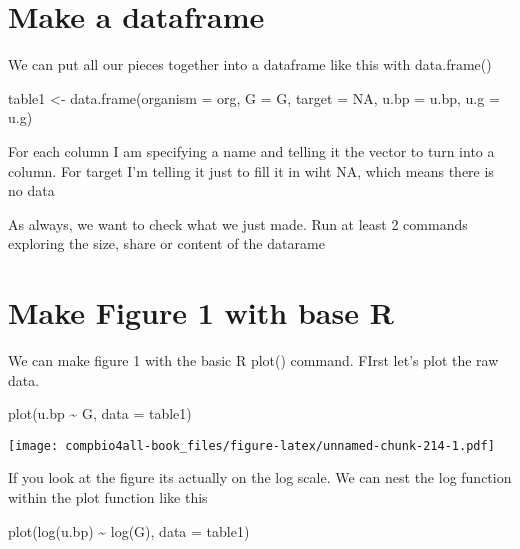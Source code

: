 \documentclass[
]{book}
\newenvironment{Shaded}{\begin{snugshade}}{\end{snugshade}}
\newcommand{\AttributeTok}[1]{\textcolor[rgb]{0.77,0.63,0.00}{#1}}
\newcommand{\ConstantTok}[1]{\textcolor[rgb]{0.00,0.00,0.00}{#1}}
\newcommand{\FunctionTok}[1]{\textcolor[rgb]{0.00,0.00,0.00}{#1}}
\newcommand{\NormalTok}[1]{#1}
\newcommand{\OtherTok}[1]{\textcolor[rgb]{0.56,0.35,0.01}{#1}}
\newcommand{\SpecialCharTok}[1]{\textcolor[rgb]{0.00,0.00,0.00}{#1}}
\begin{document}
\hypertarget{make-a-dataframe}{%
\section{Make a dataframe}\label{make-a-dataframe}}

We can put all our pieces together into a dataframe like this with data.frame()

\begin{Shaded}
\begin{Highlighting}[]
\NormalTok{table1 }\OtherTok{\textless{}{-}} \FunctionTok{data.frame}\NormalTok{(}\AttributeTok{organism =}\NormalTok{ org,}
           \AttributeTok{G =}\NormalTok{ G,}
           \AttributeTok{target =} \ConstantTok{NA}\NormalTok{,}
           \AttributeTok{u.bp =}\NormalTok{ u.bp,}
           \AttributeTok{u.g =}\NormalTok{ u.g)}
\end{Highlighting}
\end{Shaded}

For each column I am specifying a name and telling it the vector to turn into a column. For target I'm telling it just to fill it in wiht NA, which means there is no data

As always, we want to check what we just made. Run at least 2 commands exploring the size, share or content of the datarame

\hypertarget{make-figure-1-with-base-r}{%
\section{Make Figure 1 with base R}\label{make-figure-1-with-base-r}}

We can make figure 1 with the basic R plot() command. FIrst let's plot the raw data.

\begin{Shaded}
\begin{Highlighting}[]
\FunctionTok{plot}\NormalTok{(u.bp }\SpecialCharTok{\textasciitilde{}}\NormalTok{ G, }\AttributeTok{data =}\NormalTok{ table1)}
\end{Highlighting}
\end{Shaded}

\texttt{[image: compbio4all-book\_files/figure-latex/unnamed-chunk-214-1.pdf]}

If you look at the figure its actually on the log scale. We can nest the log function within the plot function like this

\begin{Shaded}
\begin{Highlighting}[]
\FunctionTok{plot}\NormalTok{(}\FunctionTok{log}\NormalTok{(u.bp) }\SpecialCharTok{\textasciitilde{}} \FunctionTok{log}\NormalTok{(G), }\AttributeTok{data =}\NormalTok{ table1)}
\end{Highlighting}
\end{Shaded}
\end{document}
